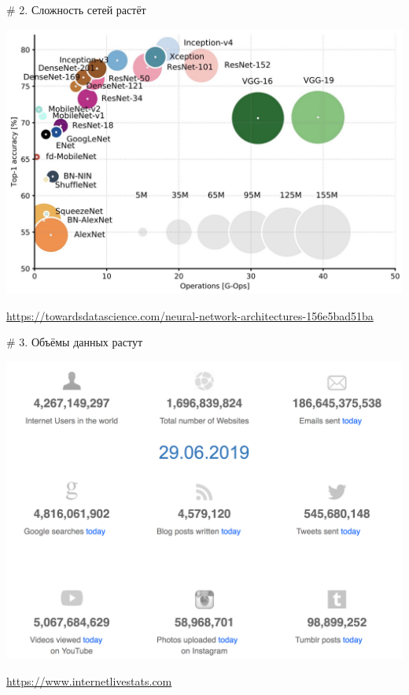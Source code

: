 \documentclass[notes,12pt, aspectratio=169]{beamer}
\newenvironment{wideitemize}{\itemize\addtolength{\itemsep}{10pt}}{\enditemize}
\begin{document}
\begin{frame}{\# 2. Сложность сетей растёт}
\begin{center}
	\includegraphics[width=.67\linewidth]{trend22.png}
\end{center}
\vfill %
\footnotesize
\color{blue} \url{https://towardsdatascience.com/neural-network-architectures-156e5bad51ba}
\end{frame}


\begin{frame}{\# 3. Объёмы данных растут}
\begin{center}
	\includegraphics[width=.6\linewidth]{trend3.png}
\end{center}
\vfill %
\footnotesize
\color{blue} \url{https://www.internetlivestats.com}
\end{frame}
\end{document}
